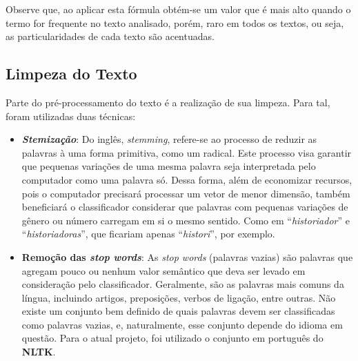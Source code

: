 Observe que, ao aplicar esta fórmula obtém-se um valor que é mais alto quando o termo for frequente no texto analisado, porém, raro em todos os textos, ou seja, as particularidades de cada texto são acentuadas.

\subsection{Limpeza do Texto}

Parte do pré-processamento do texto é a realização de sua limpeza. Para tal, foram utilizadas duas técnicas:

\begin{itemize}
\item \textbf{\textit{Stemização}}: Do inglês, \textit{stemming}, refere-se ao processo de reduzir as palavras à uma forma primitiva, como um radical. Este processo visa garantir que pequenas variações de uma mesma palavra seja interpretada pelo computador como uma palavra só. Dessa forma, além de economizar recursos, pois o computador precisará processar um vetor de menor dimensão, também beneficiará o classificador considerar que palavras com pequenas variações de gênero ou número carregam em si o mesmo sentido. Como em “\textit{historiador}” e “\textit{historiadoras}”, que ficariam apenas “\textit{histori}”, por exemplo.

\item \textbf{Remoção das \textit{stop words}}: As \textit{stop words} (palavras vazias) são palavras que agregam pouco ou nenhum valor semântico que deva ser levado em consideração pelo classificador. Geralmente, são as palavras mais comuns da língua, incluindo artigos, preposições, verbos de ligação, entre outras. Não existe um conjunto bem definido de quais palavras devem ser classificadas como palavras vazias, e, naturalmente, esse conjunto depende do idioma em questão. Para o atual projeto, foi utilizado o conjunto em português do \textbf{NLTK}.
\end{itemize}